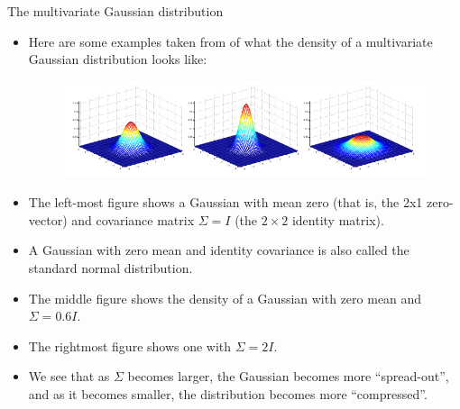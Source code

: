 \documentclass[handout]{beamer}
\begin{document}
\begin{frame}[fragile]{The multivariate Gaussian distribution}
\scriptsize{
\begin{itemize}
 
  \item Here are some examples taken from \cite{ng2008generative} of what the density of a multivariate Gaussian distribution looks like:
  
  \begin{figure}[h!]
	\centering
	\includegraphics[scale=0.4]{pics/mgaussian1.png}
\end{figure}


\item The left-most figure shows a Gaussian with mean zero (that is, the 2x1 zero-vector) and covariance matrix $\Sigma = I$ (the $2\times2$ identity matrix). 
\item A Gaussian with zero mean and identity covariance is also called the standard normal distribution.

\item The middle figure shows the density of a Gaussian with zero mean and $\Sigma = 0.6I$.

\item The rightmost figure shows one with $\Sigma = 2I$.

\item We see that as $\Sigma$ becomes larger, the Gaussian becomes more ``spread-out'', and as it becomes smaller, the distribution becomes more ``compressed''.
 
\end{itemize}
 

 
}
\end{frame}
\end{document}

